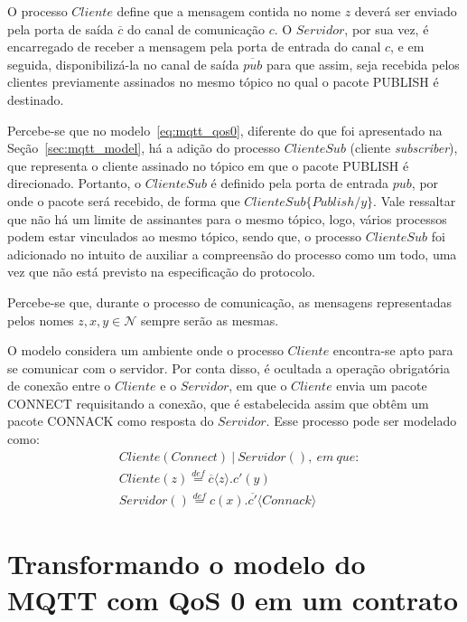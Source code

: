 O processo $Cliente$ define que a mensagem contida no nome $z$ deverá ser enviado pela porta de saída $\overline{c}$ do canal de comunicação $c$. O $Servidor$, por sua vez, é encarregado de receber a mensagem pela porta de entrada do canal $c$, e em seguida, disponibilizá-la no canal de saída $\overline{pub}$ para que assim, seja recebida pelos clientes previamente assinados no mesmo tópico no qual o pacote PUBLISH é destinado. 

Percebe-se que no modelo~\ref{eq:mqtt_qos0}, diferente do que foi apresentado na Seção~\ref{sec:mqtt_model}, há a adição do processo $ClienteSub$ (cliente \textit{subscriber}), que representa o cliente assinado no tópico em que o pacote PUBLISH é direcionado. Portanto, o $ClienteSub$ é definido pela porta de entrada $pub$, por onde o pacote será recebido, de forma que $ClienteSub\{Publish/y\}$. Vale ressaltar que não há um limite de assinantes para o mesmo tópico, logo, vários processos podem estar vinculados ao mesmo tópico, sendo que, o processo $ClienteSub$ foi adicionado no intuito de auxiliar a compreensão do processo como um todo, uma vez que não está previsto na especificação do protocolo.

Percebe-se que, durante o processo de comunicação, as mensagens representadas pelos nomes $z, x, y \in \mathcal{N}$ sempre serão as mesmas.

O modelo considera um ambiente onde o processo $Cliente$ encontra-se apto para se comunicar com o servidor. Por conta disso, é ocultada a operação obrigatória de conexão entre o $Cliente$ e o $Servidor$, em que o $Cliente$ envia um pacote CONNECT requisitando a conexão, que é estabelecida assim que obtêm um pacote CONNACK como resposta do $Servidor$. Esse processo pode ser modelado como:
\begin{align}
& Cliente(Connect)~|~Servidor(),~em~que: \nonumber \\
& Cliente(z) \stackrel{def}{=} \overline{c}\langle z \rangle . c'(y) \nonumber \\
& Servidor() \stackrel{def}{=} c(x). \overline{c'}\langle Connack \rangle
\end{align} 

\section{Transformando o modelo do MQTT com QoS 0 em um contrato}

